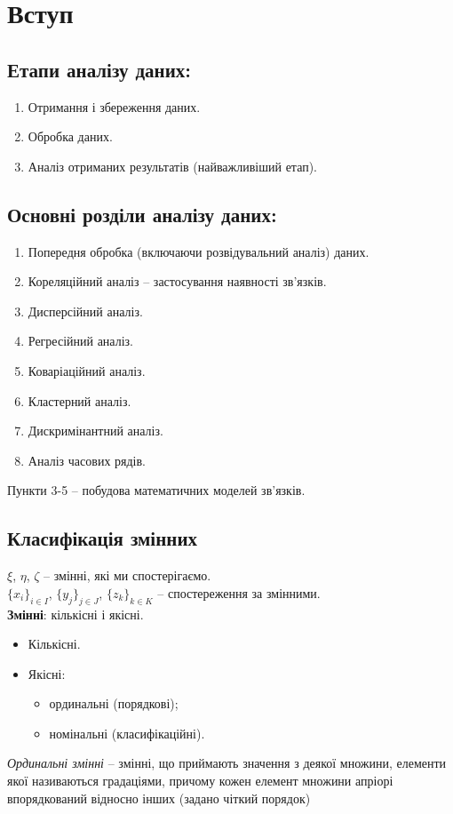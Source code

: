 \section{Вступ}
\subsection{Етапи аналізу даних:}
\begin{enumerate}
	\item Отримання і збереження даних.
	\item Обробка даних.
	\item Аналіз отриманих результатів (найважливіший етап).
\end{enumerate}
\subsection{Основні розділи аналізу даних:}
\begin{enumerate}
	\item Попередня обробка (включаючи розвідувальний аналіз) даних.
	\item Кореляційний аналіз -- застосування наявності зв'язків.
	\item Дисперсійний аналіз.
	\item Регресійний аналіз.
	\item Коваріаційний аналіз.
	\item Кластерний аналіз.
	\item Дискримінантний аналіз.
	\item Аналіз часових рядів.
\end{enumerate}
Пункти 3-5 -- побудова математичних моделей зв'язків.
\subsection{Класифікація змінних}
$\xi$, $\eta$, $\zeta$ -- змінні, які ми спостерігаємо. \\

$\{x_i\}_{i \in I}$, $\{y_j\}_{j \in J}$, $\{z_k\}_{k \in K}$ -- спостереження за змінними. \\

\textbf{Змінні}: кількісні і якісні.
\begin{itemize}
	\item Кількісні.
	\item Якісні:
	\begin{itemize}
		\item ординальні (порядкові);
		\item номінальні (класифікаційні).
	\end{itemize}
\end{itemize}
\textit{Ординальні змінні} -- змінні, що приймають значення з деякої множини, елементи якої називаються градаціями, причому кожен елемент множини апріорі впорядкований відносно інших (задано чіткий порядок) \\

